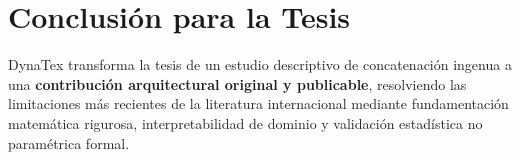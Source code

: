 \documentclass[11pt,a4paper]{article}
\begin{document}
\section{Conclusión para la Tesis}
DynaTex transforma la tesis de un estudio descriptivo de concatenación ingenua a una \textbf{contribución arquitectural original y publicable}, resolviendo las limitaciones más recientes de la literatura internacional mediante fundamentación matemática rigurosa, interpretabilidad de dominio y validación estadística no paramétrica formal.
\end{document}
